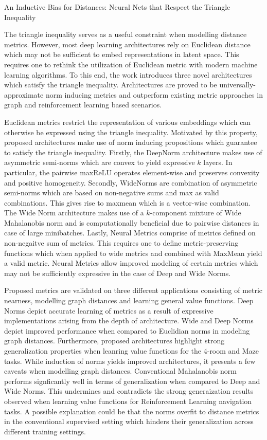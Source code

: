 \documentclass[11pt,letterpaper]{article}
\begin{document}
\begin{center}
  \large{An Inductive Bias for Distances: Neural Nets that Respect the Triangle Inequality}
\end{center}

The triangle inequality serves as a useful constraint when modelling distance metrics. However, most deep learning architectures rely on Euclidean distance which may not be sufficient to embed representations in latent space. This requires one to rethink the utilization of Euclidean metric with modern machine learning algorithms. To this end, the work introduces three novel architectures which satisfy the triangle inequality. Architectures are proved to be universally-approximate norm inducing metrics and outperform existing metric approaches in graph and reinforcement learning based scenarios. 

Euclidean metrics restrict the representation of various embeddings which can otherwise be expressed using the triangle inequality. Motivated by this property, proposed architectures make use of norm inducing propositions which guarantee to satisfy the triangle inequality. Firstly, the DeepNorm architecture makes use of asymmetric semi-norms which are convex to yield expressive $k$ layers. In particular, the pairwise maxReLU operates element-wise and preserves convexity and positive homogeneity. Secondly, WideNorms are combination of asymmetric semi-norms which are based on non-negative sums and max as valid combinations. This gives rise to maxmean which is a vector-wise combination. The Wide Norm architecture makes use of a $k$-component mixture of Wide Mahalanobis norm and is computationally beneficial due to pairwise distances in case of large minibatches. Lastly, Neural Metrics comprise of metrics defined on non-negaitve sum of metrics. This requires one to define metric-preserving functions which when applied to wide metrics and combined with MaxMean yield a valid metric. Neural Metrics allow improved modeling of certain metrics which may not be sufficiently expressive in the case of Deep and Wide Norms. 

Proposed metrics are validated on three different applications consisting of metric nearness, modelling graph distances and learning general value functions. Deep Norms depict accurate learning of metrics as a result of expressive implementations arising from the depth of architecture. Wide and Deep Norms depict improved performance when compared to Euclidian norms in modeling graph distances. Furthermore, proposed architectures highlight strong generalization properties when leanring value functions for the 4-room and Maze tasks. While induction of norms yields improved architectures, it presents a few caveats when modelling graph distances. Conventional Mahalanobis norm performs signficantly well in terms of generalization when compared to Deep and Wide Norms. This undermines and contradicts the strong generaization results observed when learning value functions for Reinforcement Learning navigation tasks. A possible explanation could be that the norms overfit to distance metrics in the conventional supervised setting which hinders their generalization across different training settings. 
\end{document}
